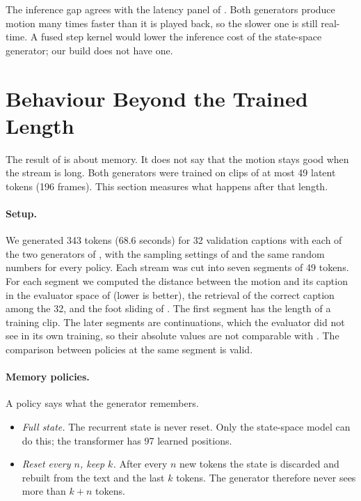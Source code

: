 The inference gap agrees with the latency panel of . Both generators produce motion many times faster than it is played back, so the slower one is still real-time. A fused step kernel would lower the inference cost of the state-space generator; our build does not have one.

\section{Behaviour Beyond the Trained Length}
\label{sec:stream_long}

The result of  is about memory. It does not say that the motion stays good when the stream is long. Both generators were trained on clips of at most 49 latent tokens (196 frames). This section measures what happens after that length.

\paragraph{Setup.} We generated 343 tokens (68.6 seconds) for 32 validation captions with each of the two generators of , with the sampling settings of  and the same random numbers for every policy. Each stream was cut into seven segments of 49 tokens. For each segment we computed the distance between the motion and its caption in the evaluator space of  (lower is better), the retrieval of the correct caption among the 32, and the foot sliding of . The first segment has the length of a training clip. The later segments are continuations, which the evaluator did not see in its own training, so their absolute values are not comparable with . The comparison between policies at the same segment is valid.

\paragraph{Memory policies.} A policy says what the generator remembers.
\begin{itemize}
\item \emph{Full state.} The recurrent state is never reset. Only the state-space model can do this; the transformer has 97 learned positions.
\item \emph{Reset every $n$, keep $k$.} After every $n$ new tokens the state is discarded and rebuilt from the text and the last $k$ tokens. The generator therefore never sees more than $k + n$ tokens.
\end{itemize}

